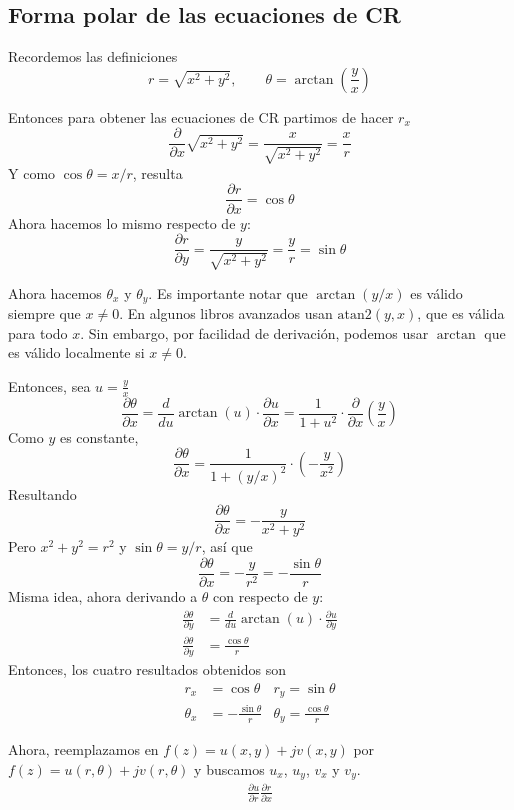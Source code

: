 \subsection{Forma polar de las ecuaciones de CR}

Recordemos las definiciones
\[
  r = \sqrt{x^2 + y^2}, \qquad \theta = \arctan\left(\frac{y}{x}\right)
\]

Entonces para obtener las ecuaciones de CR partimos de hacer $r_x$
\[
  \frac{\partial}{\partial x}\sqrt{x^2+y^2}=\frac{x}{\sqrt{x^2+y^2}} = \frac{x}{r}
\]
Y como $\cos\theta = x/r$, resulta
\[
  \frac{\partial r}{\partial x} = \cos \theta
\]
Ahora hacemos lo mismo respecto de $y$:
\[
  \frac{\partial r}{\partial y} = \frac{y}{\sqrt{x^2+y^2}} = \frac{y}{r} = \sin \theta
\]

Ahora hacemos $\theta_x$ y $\theta_y$. Es importante notar que $\arctan(y/x)$ es válido siempre que $x\neq 0$. En algunos libros avanzados usan \href{https://en.wikipedia.org/wiki/Atan2}{$\text{atan}2(y,x)$}, que es válida para todo $x$. Sin embargo, por facilidad de derivación, podemos usar $\arctan$ que es válido localmente si $x\neq 0$.

Entonces, sea $u=\frac{y}{x}$
\[
  \frac{\partial \theta}{\partial x} = \frac{d}{du}\arctan(u)\cdot\frac{\partial u}{\partial x} = \frac{1}{1+u^2}\cdot \frac{\partial}{\partial x}\left(\frac{y}{x}\right)
\]
Como $y$ es constante,
\[
  \frac{\partial \theta}{\partial x} = \frac{1}{1+(y/x)^2}\cdot \left(-\frac{y}{x^2}\right)
\]
Resultando
\[
  \frac{\partial \theta}{\partial x} = -\frac{y}{x^2 + y^2}
\]
Pero $x^2 + y^2=r^2$ y $\sin \theta = y/r$, así que 
\[
  \frac{\partial \theta}{\partial x} = -\frac{y}{r^2} = -\frac{\sin\theta}{r}
\]
Misma idea, ahora derivando a $\theta$ con respecto de $y$:
\begin{align*}
  \frac{\partial \theta}{\partial y} &= \frac{d}{du}\arctan(u)\cdot\frac{\partial u}{\partial y} \\ 
  \frac{\partial \theta}{\partial y} &= \frac{\cos \theta}{r}
\end{align*}
Entonces, los cuatro resultados obtenidos son
\begin{align*}
  r_x &= \cos \theta &r_y = \sin \theta \\ 
  \theta_x &= -\frac{\sin \theta}{r} &\theta_y =\frac{\cos \theta}{r}
\end{align*}

Ahora, reemplazamos en $f(z)=u(x,y)+jv(x,y)$ por $f(z)=u(r,\theta)+jv(r,\theta)$ y buscamos $u_x$, $u_y$, $v_x$ y $v_y$.
\begin{align*}
  \frac{\partial u}{\partial r}\frac{\partial r}{\partial x}
\end{align*}


